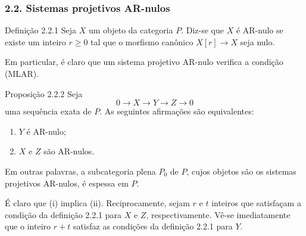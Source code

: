 \subsubsection*{2.2. Sistemas projetivos AR-nulos}
\begin{statement}{Definição 2.2.1}
Seja $X$ um objeto da categoria $P$. Diz-se que $X$ é AR-nulo se existe um inteiro $r\ge0$ tal que o morfismo canônico $X[r]\to X$ seja nulo.
\end{statement}
Em particular, é claro que um sistema projetivo AR-nulo verifica a condição (MLAR).

\begin{statement}{Proposição 2.2.2}
Seja
\[
0\longrightarrow X\longrightarrow Y\longrightarrow Z\longrightarrow0
\]
uma sequência exata de $P$. As seguintes afirmações são equivalentes:
\begin{enumerate}[label=(\roman*)]
\item $Y$ é AR-nulo;
\item $X$ e $Z$ são AR-nulos.
\end{enumerate}
Em outras palavras, a subcategoria plena $P_0$ de $P$, cujos objetos são os sistemas projetivos AR-nulos, é espessa em $P$.
\end{statement}

\begin{prooftext}[Demonstração]
É claro que (i) implica (ii). Reciprocamente, sejam $r$ e $t$ inteiros que satisfaçam a condição da definição 2.2.1 para $X$ e $Z$, respectivamente. Vê-se imediatamente que o inteiro $r+t$ satisfaz as condições da definição 2.2.1 para $Y$.
\end{prooftext}
